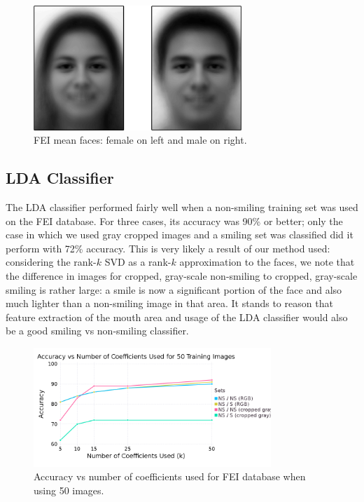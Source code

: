 \documentclass[hidelinks,11pt]{article}
\begin{document}
\begin{figure}[!ht]
  \centering
  \includegraphics[width=0.7\textwidth]{fei_mean_face_mf.png}
  \caption{FEI mean faces: female on left and male on right.}
  \label{fig:analysis:naive:mean}
\end{figure}

\subsection{LDA Classifier}
\label{sec:analysis:lda}

The LDA classifier performed fairly well when a non-smiling training set was
used on the FEI database. For three cases, its accuracy was 90\% or better; only
the case in which we used gray cropped images and a smiling set was classified
did it perform with 72\% accuracy. This is very likely a result of our method
used: considering the rank-$k$ SVD as a rank-$k$ approximation to the faces, we
note that the difference in images for cropped, gray-scale non-smiling to
cropped, gray-scale smiling is rather large: a smile is now a significant
portion of the face and also much lighter than a non-smiling image in that area.
It stands to reason that feature extraction of the mouth area and usage of the
LDA classifier would also be a good smiling vs non-smiling classifier.

\begin{figure}[!ht]
  \centering
  \includegraphics[width=0.8\textwidth]{accuracy_k.png}
  \caption{Accuracy vs number of coefficients used for FEI database when using
  50 images.}
  \label{fig:analysis:lda:accuracy_fei}
\end{figure}
\end{document}
